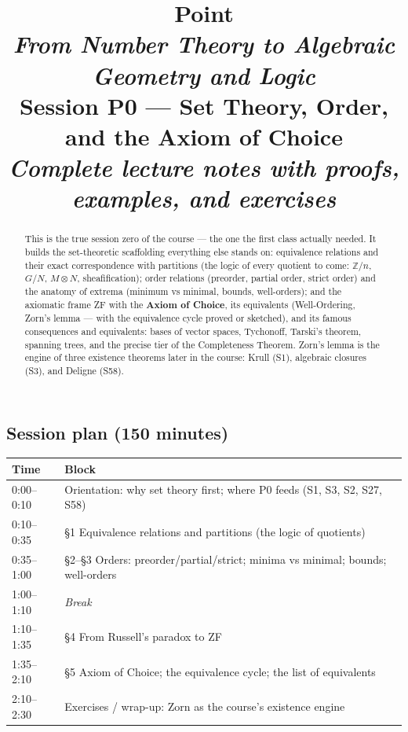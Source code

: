 \documentclass[11pt,a4paper]{article}
\title{
  {\color{blue!40!black}\textbf{\Huge Point}}\\[0.3em]
  \Large \textit{From Number Theory to Algebraic Geometry and Logic}\\[0.7em]
  \large \textbf{Session P0 --- Set Theory, Order, and the Axiom of Choice}\\[0.3em]
  \normalsize \emph{Complete lecture notes with proofs, examples, and exercises}
}
\author{}
\date{}
\theoremstyle{definition}
\newcommand{\Z}{\mathbb{Z}}
\begin{document}
\maketitle
\thispagestyle{empty}

\begin{abstract}
\noindent
This is the true session zero of the course --- the one the first class actually needed. It builds
the set-theoretic scaffolding everything else stands on: equivalence relations and their exact
correspondence with partitions (the logic of every quotient to come: $\Z/n$, $G/N$, $M\otimes N$,
sheafification); order relations (preorder, partial order, strict order) and the anatomy of
extrema (minimum vs minimal, bounds, well-orders); and the axiomatic frame ZF with the
\textbf{Axiom of Choice}, its equivalents (Well-Ordering, Zorn's lemma --- with the equivalence
cycle proved or sketched), and its famous consequences and equivalents: bases of vector spaces,
Tychonoff, Tarski's theorem, spanning trees, and the precise tier of the Completeness Theorem.
Zorn's lemma is the engine of three existence theorems later in the course: Krull (S1), algebraic
closures (S3), and Deligne (S58).
\end{abstract}

\subsection*{Session plan (150 minutes)}
\begin{center}\small
\begin{tabular}{|l|l|}
\hline
\textbf{Time} & \textbf{Block} \\
\hline
0:00--0:10 & Orientation: why set theory first; where P0 feeds (S1, S3, S2, S27, S58) \\
0:10--0:35 & \S1 Equivalence relations and partitions (the logic of quotients) \\
0:35--1:00 & \S2--\S3 Orders: preorder/partial/strict; minima vs minimal; bounds; well-orders \\
1:00--1:10 & \emph{Break} \\
1:10--1:35 & \S4 From Russell's paradox to ZF \\
1:35--2:10 & \S5 Axiom of Choice; the equivalence cycle; the list of equivalents \\
2:10--2:30 & Exercises / wrap-up: Zorn as the course's existence engine \\
\hline
\end{tabular}
\end{center}
\end{document}
